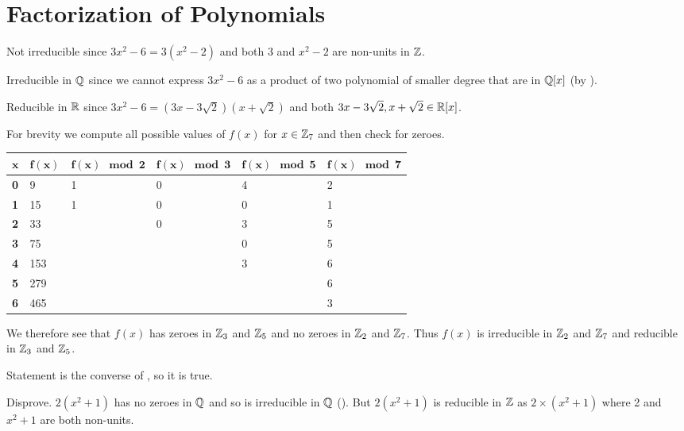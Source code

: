 \section{Factorization of Polynomials}
\begin{questions}
    \item \begin{partquestions}{\alph*}
        \item Not irreducible since $3x^2 - 6 = 3(x^2-2)$ and both 3 and $x^2-2$ are non-units in $\mathbb{Z}$.
        \item Irreducible in $\mathbb{Q}$ since we cannot express $3x^2-6$ as a product of two polynomial of smaller degree that are in $\mathbb{Q}[x]$ (by ).
        \item Reducible in $\mathbb{R}$ since $3x^2 - 6 = (3x-3\sqrt2)(x+\sqrt2)$ and both $3x-3\sqrt2, x+\sqrt2 \in \mathbb{R}[x]$.
    \end{partquestions}
    
    \item For brevity we compute all possible values of $f(x)$ for $x \in \mathbb{Z}_7$ and then check for zeroes.
    \begin{table}[H]
        \centering
        \begin{tabular}{|l|l|l|l|l|l|}
            \hline
            $\boldsymbol{x}$ & $\boldsymbol{f(x)}$ & $\boldsymbol{f(x) \mod2}$ & $\boldsymbol{f(x) \mod3}$ & $\boldsymbol{f(x) \mod5}$ & $\boldsymbol{f(x) \mod7}$ \\ \hline
            \textbf{0} & 9 & 1 & 0 & 4 & 2 \\ \hline
            \textbf{1} & 15 & 1 & 0 & 0 & 1 \\ \hline
            \textbf{2} & 33 &  & 0 & 3 & 5 \\ \hline
            \textbf{3} & 75 &  &  & 0 & 5 \\ \hline
            \textbf{4} & 153 &  &  & 3 & 6 \\ \hline
            \textbf{5} & 279 &  &  &  & 6 \\ \hline
            \textbf{6} & 465 &  &  &  & 3 \\ \hline
        \end{tabular}
    \end{table}
    We therefore see that $f(x)$ has zeroes in $\mathbb{Z}_3$ and $\mathbb{Z}_5$ and no zeroes in $\mathbb{Z}_2$ and $\mathbb{Z}_7$. Thus $f(x)$ is irreducible in $\mathbb{Z}_2$ and $\mathbb{Z}_7$ and reducible in $\mathbb{Z}_3$ and $\mathbb{Z}_5$.

    \item \begin{partquestions}{\alph*}
        \item Statement is the converse of , so it is true.
        \item Disprove. $2(x^2+1)$ has no zeroes in $\mathbb{Q}$ and so is irreducible in $\mathbb{Q}$ (). But $2(x^2+1)$ is reducible in $\mathbb{Z}$ as $2 \times (x^2 + 1)$ where 2 and $x^2 + 1$ are both non-units.
    \end{partquestions}


\end{questions}
